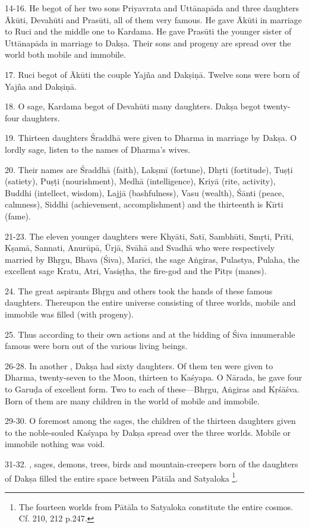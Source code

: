 14-16. He begot of her two sons Priyavrata and Uttānapāda and three daughters
Ākūti, Devahūti and Prasūti, all of them very famous. He gave Ākūti in marriage
to Ruci and the middle one to Kardama. He gave Prasūti the younger sister of
Uttānapāda in marriage to Dakṣa. Their sons and progeny are spread over
the world both mobile and immobile.

17. Ruci begot of Ākūti the couple Yajña and Dakṣiṇā. Twelve sons were born of
Yajña and Dakṣiṇā.

18. O sage, Kardama begot of Devahūti many daughters. Dakṣa begot twenty-four
daughters.

19. Thirteen daughters Śraddhā \etc were given to Dharma in marriage by Dakṣa.
O lordly sage, listen to the names of Dharma’s wives.

20. Their names are Śraddhā (faith), Lakṣmī (fortune), Dhṛti (fortitude), Tuṣṭi
(satiety), Puṣṭi (nourishment), Medhā (intelligence), Kriyā (rite, activity),
Buddhi (intellect, wisdom), Lajjā (bashfulness), Vasu (wealth), Śānti (peace,
calmness), Siddhi (achievement, accomplishment) and the thirteenth is Kīrti
(fame).

21-23. The eleven younger daughters were Khyāti, Satī, Sambhūti, Smṛti, Prīti,
Kṣamā, Sannati, Anurūpā, Ūrjā, Svāhā and Svadhā who were respectively married by
Bhṛgu, Bhava (Śiva), Marīci, the sage Aṅgiras, Pulastya, Pulaha, the excellent
sage Kratu, Atri, Vasiṣṭha, the fire-god and the Pitṛs (manes).

24. The great aspirants Bhṛgu and others took the hands of these famous
daughters. Thereupon the entire universe consisting of three worlds, mobile and
immobile was filled (with progeny).

25. Thus according to their own actions and at the bidding of Śiva innumerable
famous  were born out of the various living beings.

26-28. In another , Dakṣa had sixty daughters. Of them ten were given
to Dharma, twenty-seven to the Moon, thirteen to Kaśyapa. O Nārada, he gave four
to Garuḍa of excellent form. Two to each of these—Bhṛgu, Aṅgiras and Kṛśāśva.
Born of them are many children in the world of mobile and immobile.

29-30. O foremost among the sages, the children of the thirteen daughters given
to the noble-souled Kaśyapa by Dakṣa spread over the three worlds. Mobile or
immobile nothing was void.

31-32. , sages, demons, trees, birds and mountain-creepers born of
the daughters of Dakṣa filled the entire space between Pātāla and Satyaloka
\footnote{The fourteen worlds from Pātāla to Satyaloka constitute the entire
cosmos. Cf.  210, 212 p.247.}.


